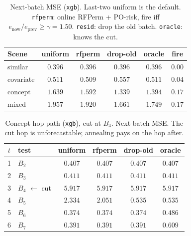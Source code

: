 \begin{table}[ht]\centering
\caption{Next-batch MSE (\texttt{xgb}). Last-two uniform is the
default. \texttt{rfperm}: online RFPerm + PO-risk, fire iff $e_{\mathrm{now}}/e_{\mathrm{prev}}\ge\gamma=1.50$.
\texttt{resid}: drop the old batch. \texttt{oracle}: knows the cut.}
\label{tab:po-refit-mse-xgb}
\small
\setlength{\tabcolsep}{4pt}
\begin{tabular}{@{}lccccc@{}}\toprule
Scene & uniform & rfperm & drop-old & oracle & fire \\
\midrule
similar & $\mathbf{0.396}$ & $\mathbf{0.396}$ & $\mathbf{0.396}$ & $0.396$ & $0.00$ \\
covariate & $0.511$ & $\mathbf{0.509}$ & $0.557$ & $0.511$ & $0.04$ \\
concept & $1.639$ & $1.592$ & $\mathbf{1.339}$ & $1.394$ & $0.17$ \\
mixed & $1.957$ & $1.920$ & $\mathbf{1.661}$ & $1.749$ & $0.17$ \\
\bottomrule
\end{tabular}
\end{table}

\begin{table}[ht]\centering
\caption{Concept hop path (\texttt{xgb}), cut at $B_4$.
Next-batch MSE. The cut hop is unforecastable; annealing pays on the hop after.}
\label{tab:po-refit-concept-xgb}
\small
\setlength{\tabcolsep}{4pt}
\begin{tabular}{@{}clcccc@{}}\toprule
$t$ & test & uniform & rfperm & drop-old & oracle \\
\midrule
1 & $B_{2}$ & $\mathbf{0.407}$ & $\mathbf{0.407}$ & $\mathbf{0.407}$ & $0.407$ \\
2 & $B_{3}$ & $\mathbf{0.411}$ & $\mathbf{0.411}$ & $\mathbf{0.411}$ & $0.411$ \\
3 & $B_{4}$ $\leftarrow$ cut & $\mathbf{5.917}$ & $\mathbf{5.917}$ & $\mathbf{5.917}$ & $5.917$ \\
4 & $B_{5}$ & $2.334$ & $2.051$ & $\mathbf{0.535}$ & $0.535$ \\
5 & $B_{6}$ & $\mathbf{0.374}$ & $\mathbf{0.374}$ & $\mathbf{0.374}$ & $0.486$ \\
6 & $B_{7}$ & $\mathbf{0.391}$ & $\mathbf{0.391}$ & $\mathbf{0.391}$ & $0.609$ \\
\bottomrule
\end{tabular}
\end{table}
